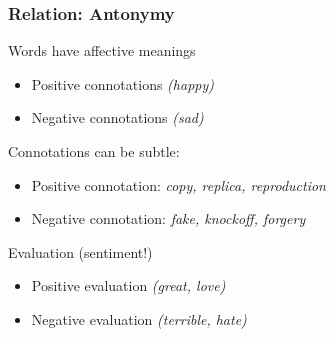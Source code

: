 \documentclass[13.5pt,aspecratio=169, xcolor=dvipsnames]{beamer}
\begin{document}
                        \begin{frame}
                            \onehalfspacing
                                \frametitle{Relation: Antonymy}
                                {\Large
                                Words have affective meanings
                                \begin{itemize}
                                    \item Positive connotations \textit{(happy)}
                                    \item Negative connotations \textit{(sad)}
                                \end{itemize}
    
                                \bigskip
                                \begin{block}{Connotations can be subtle:}
                                    \begin{itemize}
                                        \item Positive connotation: \textit{copy, replica, reproduction}
                                        \item Negative connotation: \textit{fake, knockoff, forgery}
                                    \end{itemize}
                                \end{block}
    
                                Evaluation (sentiment!)
                                \begin{itemize}
                                    \item Positive evaluation \textit{(great, love)}
                                    \item Negative evaluation \textit{(terrible, hate)}
                                \end{itemize}
                                }
                            \end{frame}
    
\end{document}
